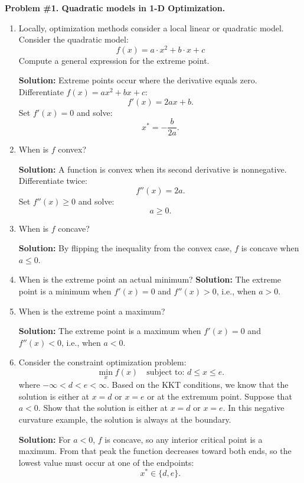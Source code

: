 \documentclass[11pt]{article}
\begin{document}
	
\textbf{Problem \#1. Quadratic models in 1-D Optimization.}
		
\begin{enumerate}[label=1(\alph*)]
	\item Locally, optimization methods consider a local linear or quadratic model. Consider the quadratic model:
	\[
	f(x) = a \cdot x^{2} + b \cdot x + c
	\]
	Compute a general expression for the extreme point.
	
	\textbf{Solution:} 
	Extreme points occur where the derivative equals zero. Differentiate $f(x) = a x^{2} + b x + c$:
	\[
	f'(x) = 2 a x + b.
	\]
	Set $f'(x) = 0$ and solve:
	\[
	x^* = -\frac{b}{2 a}.
	\]
	
	\item When is $f$ convex?

	\textbf{Solution:} 
	A function is convex when its second derivative is nonnegative. Differentiate twice:
	\[
	f''(x) = 2 a.
	\]
	Set $f''(x) \ge 0$ and solve:
	\[
	a \ge 0.
	\]
	
	\item When is $f$ concave?
	
	\textbf{Solution:} 
	By flipping the inequality from the convex case, $f$ is concave when $a \le 0$.
	
	\item When is the extreme point an actual minimum?
	\textbf{Solution:}  
	The extreme point is a minimum when $f'(x) = 0$ and $f''(x) > 0$, i.e., when $a > 0$.
	
	\item When is the extreme point a maximum?
	
	\textbf{Solution:}  
	The extreme point is a maximum when $f'(x) = 0$ and $f''(x) < 0$, i.e., when $a < 0$.
	
	\item Consider the constraint optimization problem:
	\[
	\min_{x} f(x) \quad \text{subject to: } d \le x \le e.
	\]
	where $-\infty < d < e < \infty$. Based on the KKT conditions, we know that the solution is either at $x = d$ or
	$x = e$ or at the extremum point. Suppose that $a < 0$. Show that the solution is either at $x = d$ or $x = e$. In
	this negative curvature example, the solution is always at the boundary.

	\textbf{Solution:}  
	For $a<0$, $f$ is concave, so any interior critical point is a maximum.  
	From that peak the function decreases toward both ends, so the lowest value must occur at one of the endpoints:
	\[
	x^* \in \{d, e\}.
	\]


\end{enumerate}
\end{document}
